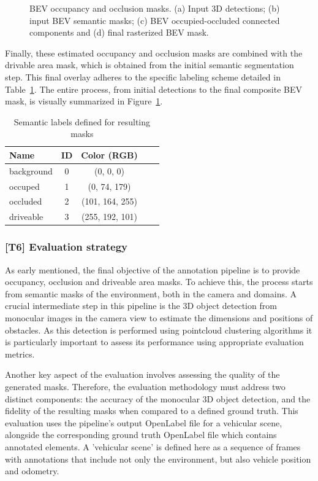 \begin{figure}[!ht]
    \caption{BEV occupancy and occlusion masks. (a) Input 3D detections; (b) input BEV semantic masks; (c) BEV occupied-occluded connected components and (d) final rasterized BEV mask.}
    \label{fig:bev_occupancy_occlusion}
\end{figure}


Finally, these estimated occupancy and occlusion masks are combined with the  drivable area mask, which is obtained from the initial semantic segmentation step. This final overlay adheres to the specific labeling scheme detailed in Table~\ref{tab:occ2_labels}. The entire process, from initial detections to the final composite BEV mask, is visually summarized in Figure~\ref{fig:bev_occupancy_occlusion}.

\begin{table}[ht]
    \centering
    \begin{tabular}{l c c c c}
        \toprule
        \textbf{Name} & \textbf{ID} & \textbf{Color (RGB)} \\
        \midrule
        background  & 0 & (0, 0, 0)         \\
        occuped     & 1 & (0, 74, 179)      \\
        occluded    & 2 & (101, 164, 255)   \\
        driveable   & 3 & (255, 192, 101)   \\

        \bottomrule
    \end{tabular}
    \caption{Semantic labels defined for resulting masks}
    \label{tab:occ2_labels}
\end{table}

\subsubsection{[T6] Evaluation strategy}
As early mentioned, the final objective of the annotation pipeline is to provide occupancy, occlusion and driveable area masks. To achieve this, the process starts from semantic masks of the environment, both in the camera and  domains. A crucial intermediate step in this pipeline is the 3D object detection from monocular images in the camera view to estimate the dimensions and positions of obstacles. As this detection is performed using pointcloud clustering algorithms it is particularly important to assess its performance using appropriate evaluation metrics.

Another key aspect of the evaluation involves assessing the quality of the generated  masks. Therefore, the evaluation methodology must address two distinct components: the accuracy of the monocular 3D object detection, and the fidelity of the resulting  masks when compared to a defined ground truth. This evaluation uses the pipeline's output OpenLabel file for a vehicular scene, alongside the corresponding ground truth OpenLabel file which contains annotated elements. A 'vehicular scene' is defined here as a sequence of frames with annotations that include not only the environment, but also vehicle position and odometry.

